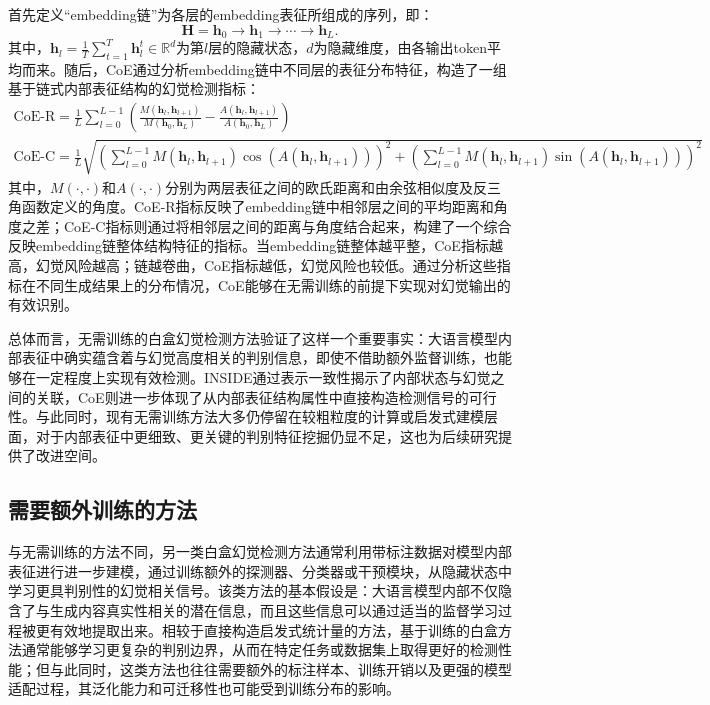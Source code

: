 首先定义“embedding链”为各层的embedding表征所组成的序列，即：
\begin{equation}
    \mathbf{H}=\mathbf{h}_0\rightarrow \mathbf{h}_1\rightarrow\cdots\rightarrow \mathbf{h}_L.
\end{equation}
其中，$\mathbf{h}_l=\frac{1}{T}\sum_{t=1}^{T}\mathbf{h}_l^t\in\mathbb{R}^{d}$为第$l$层的隐藏状态，$d$为隐藏维度，由各输出token平均而来。随后，CoE通过分析embedding链中不同层的表征分布特征，构造了一组基于链式内部表征结构的幻觉检测指标：
\begin{gather}
\text{CoE-R}=\frac{1}{L}\sum_{l=0}^{L-1}\left (\frac{M(\mathbf{h}_l,\mathbf{h}_{l+1})}{M(\mathbf{h}_0,\mathbf{h}_L)}-\frac{A(\mathbf{h}_l, \mathbf{h}_{l+1})}{A(\mathbf{h}_0, \mathbf{h}_L)}\right ) \\
\text{CoE-C}=\frac{1}{L} \sqrt{\left(\sum_{l=0}^{L-1} M(\mathbf{h}_{l}, \mathbf{h}_{l+1}) \cos (A(\mathbf{h}_{l}, \mathbf{h}_{l+1}))\right)^{2}+\left(\sum_{l=0}^{L-1} M(\mathbf{h}_{l}, \mathbf{h}_{l+1}) \sin (A(\mathbf{h}_{l}, \mathbf{h}_{l+1}))\right)^{2}}
\end{gather}
其中，$M(\cdot, \cdot)$和$A(\cdot, \cdot)$分别为两层表征之间的欧氏距离和由余弦相似度及反三角函数定义的角度。CoE-R指标反映了embedding链中相邻层之间的平均距离和角度之差；CoE-C指标则通过将相邻层之间的距离与角度结合起来，构建了一个综合反映embedding链整体结构特征的指标。当embedding链整体越平整，CoE指标越高，幻觉风险越高；链越卷曲，CoE指标越低，幻觉风险也较低。通过分析这些指标在不同生成结果上的分布情况，CoE能够在无需训练的前提下实现对幻觉输出的有效识别。

总体而言，无需训练的白盒幻觉检测方法验证了这样一个重要事实：大语言模型内部表征中确实蕴含着与幻觉高度相关的判别信息，即使不借助额外监督训练，也能够在一定程度上实现有效检测。INSIDE通过表示一致性揭示了内部状态与幻觉之间的关联，CoE则进一步体现了从内部表征结构属性中直接构造检测信号的可行性。与此同时，现有无需训练方法大多仍停留在较粗粒度的计算或启发式建模层面，对于内部表征中更细致、更关键的判别特征挖掘仍显不足，这也为后续研究提供了改进空间。

\subsection{需要额外训练的方法}\label{subsec:white_box_need_training}

与无需训练的方法不同，另一类白盒幻觉检测方法通常利用带标注数据对模型内部表征进行进一步建模，通过训练额外的探测器、分类器或干预模块，从隐藏状态中学习更具判别性的幻觉相关信号。该类方法的基本假设是：大语言模型内部不仅隐含了与生成内容真实性相关的潜在信息，而且这些信息可以通过适当的监督学习过程被更有效地提取出来。相较于直接构造启发式统计量的方法，基于训练的白盒方法通常能够学习更复杂的判别边界，从而在特定任务或数据集上取得更好的检测性能；但与此同时，这类方法也往往需要额外的标注样本、训练开销以及更强的模型适配过程，其泛化能力和可迁移性也可能受到训练分布的影响。

